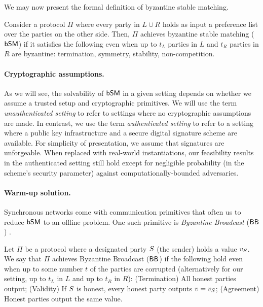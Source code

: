 We may now present the formal definition of byzantine stable matching. 
\begin{definition}
Consider a protocol $\Pi$ where every party in $L \cup R$ holds as input a preference list over the parties on the other side. Then, $\Pi$ achieves byzantine stable matching ($\textsf{bSM}$) if it satisfies the following even when up to $t_L$ parties in $L$ and $t_R$ parties in $R$ are byzantine: termination, symmetry, stability, non-competition.
\end{definition}


\paragraph{Cryptographic assumptions.}
As we will see, the solvability of $\textsf{bSM}$ in a given setting depends on whether we assume a trusted setup and cryptographic primitives. We will use the term \emph{unauthenticated setting} to refer to settings where no cryptographic assumptions are made. In contrast, we use the term \emph{authenticated setting} to refer to a setting where a public key infrastructure and a secure digital signature scheme are available. For simplicity of presentation, we assume that signatures are unforgeable. When replaced with real-world instantiations, our feasibility results in the authenticated setting still hold except for negligible probability (in the scheme's security parameter) against computationally-bounded adversaries.



\paragraph{Warm-up solution.} 
Synchronous networks come with communication primitives that often us to reduce $\textsf{bSM}$ to an offline problem. One such primitive is \emph{Byzantine Broadcast} ($\textsf{BB}$) \cite{LSP82}.
\begin{definition}\label{def:bc}
	Let $\Pi$ be a protocol where a designated party $S$ (the sender) holds a value $v_{S}$. 
    We say that $\Pi$ achieves Byzantine Broadcast ($\textsf{BB}$) if the following hold even when up to some number $t$ of the parties are corrupted (alternatively for our setting, up to $t_L$ in $L$ and up to $t_R$ in $R$):
    (Termination) All honest parties output; 
    (Validity) If $S$ is honest, every honest party outputs $v = v_{S}$;
    (Agreement) Honest parties output the same value.
\end{definition}


